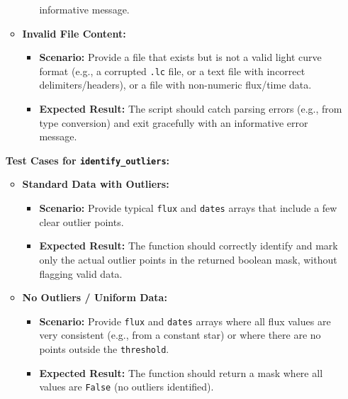 \documentclass[a4paper,12pt]{article}
\DeclareRobustCommand{\bold}{\fontseries{b}\selectfont}
\newcommand{\bcode}[1]{\texttt{\fontsize{11}{13}\selectfont\bold#1}}
\newenvironment{solution}{}{}
\begin{document}
\begin{enumerate}
\begin{solution}
\begin{itemize}
\begin{itemize}
                    informative message.
                \end{itemize}
                \item \textbf{Invalid File Content:}
                \begin{itemize}
                    \item \textbf{Scenario:} Provide a file that exists but is
                    not a valid light curve format (e.g., a corrupted \bcode{.lc}
                    file, or a text file with incorrect delimiters/headers), or
                    a file with non-numeric flux/time data.
                    \item \textbf{Expected Result:} The script should catch
                    parsing errors (e.g., from type conversion) and exit
                    gracefully with an informative error message.
                \end{itemize}
            \end{itemize}
            \textbf{Test Cases for \bcode{identify\_outliers}:} 
            \begin{itemize}
                \item \textbf{Standard Data with Outliers:}
                \begin{itemize}
                    \item \textbf{Scenario:} Provide typical \bcode{flux} and 
                    \bcode{dates} arrays that include a few clear outlier points.
                    \item \textbf{Expected Result:} The function should correctly
                    identify and mark only the actual outlier points in the
                    returned boolean mask, without flagging valid data.
                \end{itemize}
                \item \textbf{No Outliers / Uniform Data:}
                \begin{itemize}
                    \item \textbf{Scenario:} Provide \bcode{flux} and \bcode{dates}
                    arrays where all flux values are very consistent (e.g., from
                    a constant star) or where there are no points outside the
                    \bcode{threshold}.
                    \item \textbf{Expected Result:} The function should return a
                    mask where all values are \bcode{False} (no outliers identified).
                \end{itemize}

\end{itemize}
\end{solution}
\end{enumerate}
\end{document}
